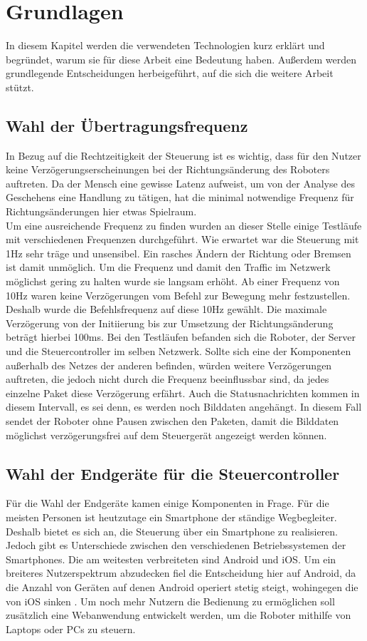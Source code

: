\chapter{Grundlagen}
\label{ch:Grundlagen}

In diesem Kapitel werden die verwendeten Technologien kurz erklärt und begründet, warum sie für diese Arbeit eine Bedeutung haben. Außerdem werden grundlegende Entscheidungen herbeigeführt, auf die sich die weitere Arbeit stützt.

\section{Wahl der Übertragungsfrequenz}
\label{sec:wahl_frequenz}
In Bezug auf die Rechtzeitigkeit der Steuerung ist es wichtig, dass für den Nutzer keine Verzögerungserscheinungen bei der Richtungsänderung des Roboters auftreten. Da der Mensch eine gewisse Latenz aufweist, um von der Analyse des Geschehens eine Handlung zu tätigen, hat die minimal notwendige Frequenz für Richtungsänderungen hier etwas Spielraum. \\
Um eine ausreichende Frequenz zu finden wurden an dieser Stelle einige Testläufe mit verschiedenen Frequenzen durchgeführt. Wie erwartet war die Steuerung mit 1Hz sehr träge und unsensibel. Ein rasches Ändern der Richtung oder Bremsen ist damit unmöglich. Um die Frequenz und damit den Traffic im Netzwerk möglichst gering zu halten wurde sie langsam erhöht. Ab einer Frequenz von 10Hz waren keine Verzögerungen vom Befehl zur Bewegung mehr festzustellen. Deshalb wurde die Befehlsfrequenz auf diese 10Hz gewählt. Die maximale Verzögerung von der Initiierung bis zur Umsetzung der Richtungsänderung beträgt hierbei 100ms. Bei den Testläufen befanden sich die Roboter, der Server und die Steuercontroller im selben Netzwerk. Sollte sich eine der Komponenten außerhalb des Netzes der anderen befinden, würden weitere Verzögerungen auftreten, die jedoch nicht durch die Frequenz beeinflussbar sind, da jedes einzelne Paket diese Verzögerung erfährt. Auch die Statusnachrichten kommen in diesem Intervall, es sei denn, es werden noch Bilddaten angehängt. In diesem Fall sendet der Roboter ohne Pausen zwischen den Paketen, damit die Bilddaten möglichst verzögerungsfrei auf dem Steuergerät angezeigt werden können. 


\section{Wahl der Endgeräte für die Steuercontroller}
\label{sec:wahl_endgeraete}
Für die Wahl der Endgeräte kamen einige Komponenten in Frage. Für die meisten Personen ist heutzutage ein Smartphone der ständige Wegbegleiter. Deshalb bietet es sich an, die Steuerung über ein Smartphone zu realisieren. Jedoch gibt es Unterschiede zwischen den verschiedenen Betriebssystemen der Smartphones. Die am weitesten verbreiteten sind Android und iOS. Um ein breiteres Nutzerspektrum abzudecken fiel die Entscheidung hier auf Android, da die Anzahl von Geräten auf denen Android operiert stetig steigt, wohingegen die von iOS sinken \cite{ANDROIDIOS}. Um noch mehr Nutzern die Bedienung zu ermöglichen soll zusätzlich eine Webanwendung entwickelt werden, um die Roboter mithilfe von Laptops oder PCs zu steuern. 


